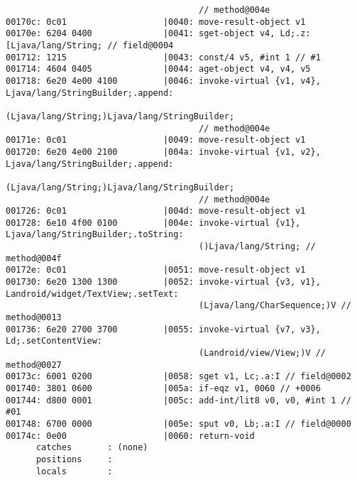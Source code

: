 \begin{lstlisting}
                                      // method@004e
00170c: 0c01                   |0040: move-result-object v1
00170e: 6204 0400              |0041: sget-object v4, Ld;.z:[Ljava/lang/String; // field@0004
001712: 1215                   |0043: const/4 v5, #int 1 // #1
001714: 4604 0405              |0044: aget-object v4, v4, v5
001718: 6e20 4e00 4100         |0046: invoke-virtual {v1, v4}, Ljava/lang/StringBuilder;.append:
                                      (Ljava/lang/String;)Ljava/lang/StringBuilder;
                                      // method@004e
00171e: 0c01                   |0049: move-result-object v1
001720: 6e20 4e00 2100         |004a: invoke-virtual {v1, v2}, Ljava/lang/StringBuilder;.append:
                                      (Ljava/lang/String;)Ljava/lang/StringBuilder;
                                      // method@004e
001726: 0c01                   |004d: move-result-object v1
001728: 6e10 4f00 0100         |004e: invoke-virtual {v1}, Ljava/lang/StringBuilder;.toString:
                                      ()Ljava/lang/String; // method@004f
00172e: 0c01                   |0051: move-result-object v1
001730: 6e20 1300 1300         |0052: invoke-virtual {v3, v1}, Landroid/widget/TextView;.setText:
                                      (Ljava/lang/CharSequence;)V // method@0013
001736: 6e20 2700 3700         |0055: invoke-virtual {v7, v3}, Ld;.setContentView:
                                      (Landroid/view/View;)V // method@0027
00173c: 6001 0200              |0058: sget v1, Lc;.a:I // field@0002
001740: 3801 0600              |005a: if-eqz v1, 0060 // +0006
001744: d800 0001              |005c: add-int/lit8 v0, v0, #int 1 // #01
001748: 6700 0000              |005e: sput v0, Lb;.a:I // field@0000
00174c: 0e00                   |0060: return-void
      catches       : (none)
      positions     :
      locals        :


\end{lstlisting}
